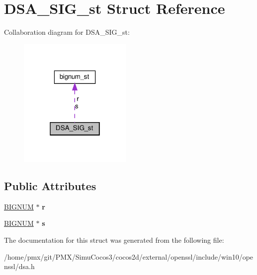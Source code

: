 \hypertarget{structDSA__SIG__st}{}\section{D\+S\+A\+\_\+\+S\+I\+G\+\_\+st Struct Reference}
\label{structDSA__SIG__st}


Collaboration diagram for D\+S\+A\+\_\+\+S\+I\+G\+\_\+st\+:
\nopagebreak
\begin{figure}[H]
\begin{center}
\leavevmode
\includegraphics[width=154pt]{structDSA__SIG__st__coll__graph}
\end{center}
\end{figure}
\subsection*{Public Attributes}
\begin{DoxyCompactItemize}
\item 
\mbox{\label{structDSA__SIG__st_a745899b460d408e175d9adee66ef046e}} 
\hyperlink{structbignum__st}{B\+I\+G\+N\+UM} $\ast$ {\bfseries r}
\item 
\mbox{\label{structDSA__SIG__st_ae7c55f852d6ca0b46b5d5c99dcfb8c2d}} 
\hyperlink{structbignum__st}{B\+I\+G\+N\+UM} $\ast$ {\bfseries s}
\end{DoxyCompactItemize}


The documentation for this struct was generated from the following file\+:\begin{DoxyCompactItemize}
\item 
/home/pmx/git/\+P\+M\+X/\+Simu\+Cocos3/cocos2d/external/openssl/include/win10/openssl/dsa.\+h\end{DoxyCompactItemize}
